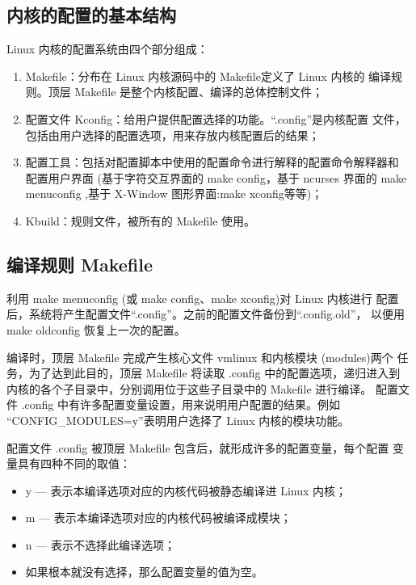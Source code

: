 \subsection{内核的配置的基本结构}
Linux 内核的配置系统由四个部分组成：
\begin{enumerate}
  \item Makefile：分布在 Linux 内核源码中的 Makefile定义了 Linux 内核的
		编译规则。顶层 Makefile 是整个内核配置、编译的总体控制文件；
  \item 配置文件 Kconfig：给用户提供配置选择的功能。``.config''是内核配置
		文件，包括由用户选择的配置选项，用来存放内核配置后的结果；
  \item 配置工具：包括对配置脚本中使用的配置命令进行解释的配置命令解释器和
		配置用户界面 (基于字符交互界面的 make config，基于 ncurses 界面的
        make menuconfig ,基于 X-Window 图形界面:make xconfig等等)；
  \item Kbuild：规则文件，被所有的 Makefile 使用。
\end{enumerate}

\subsection{编译规则 Makefile}
利用 make menuconfig (或 make config、make xconfig)对 Linux 内核进行
配置后，系统将产生配置文件``.config''。之前的配置文件备份到``.config.old''，
以便用 make oldconfig 恢复上一次的配置。

编译时，顶层 Makefile 完成产生核心文件 vmlinux 和内核模块 (modules)两个
任务，为了达到此目的，顶层 Makefile 将读取 .config 中的配置选项，递归进入到
内核的各个子目录中，分别调用位于这些子目录中的 Makefile 进行编译。
配置文件 .config 中有许多配置变量设置，用来说明用户配置的结果。例如
``CONFIG\_MODULES=y''表明用户选择了 Linux 内核的模块功能。

配置文件 .config 被顶层 Makefile 包含后，就形成许多的配置变量，每个配置
变量具有四种不同的取值：
\begin{itemize}
  \item y --- 表示本编译选项对应的内核代码被静态编译进 Linux 内核；
  \item m --- 表示本编译选项对应的内核代码被编译成模块；
  \item n --- 表示不选择此编译选项；
  \item 如果根本就没有选择，那么配置变量的值为空。
\end{itemize}

